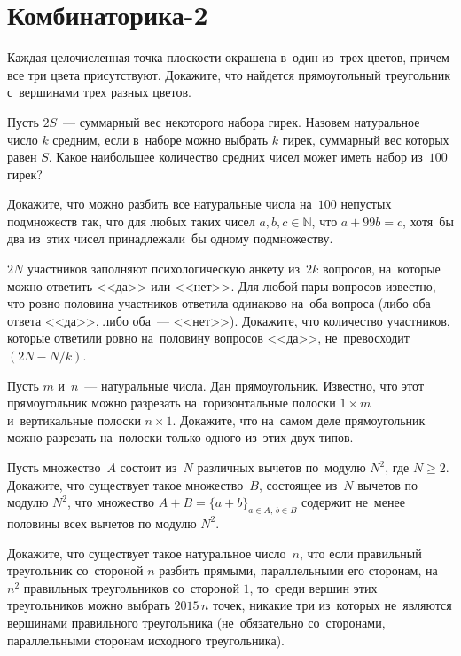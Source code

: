 
\section*{Комбинаторика-2}


\begin{problems}

\item
Каждая целочисленная точка плоскости окрашена в~один из~трех цветов, причем все
три цвета присутствуют.
Докажите, что найдется прямоугольный треугольник с~вершинами трех разных
цветов.

\item
Пусть $2 S$~--- суммарный вес некоторого набора гирек.
Назовем натуральное число $k$ средним, если в~наборе можно выбрать $k$ гирек,
суммарный вес которых равен $S$.
Какое наибольшее количество средних чисел может иметь набор из~$100$ гирек?

\item
Докажите, что можно разбить все натуральные числа на~$100$ непустых подмножеств
так, что для любых таких чисел $a, b, c \in \mathbb{N}$, что $a + 99 b = c$,
хотя~бы два из~этих чисел принадлежали~бы одному подмножеству.

\item
$2 N$ участников заполняют психологическую анкету из~$2 k$ вопросов, на~которые
можно ответить <<да>> или <<нет>>.
Для любой пары вопросов известно, что ровно половина участников ответила
одинаково на~оба вопроса (либо оба ответа <<да>>, либо оба~--- <<нет>>).
Докажите, что количество участников, которые ответили ровно на~половину
вопросов <<да>>, не~превосходит $(2 N - N / k)$.

\item
Пусть $m$ и~$n$~--- натуральные числа.
Дан прямоугольник.
Известно, что этот прямоугольник можно разрезать на~горизонтальные полоски
$1 \times m$ и~вертикальные полоски $n \times 1$.
Докажите, что на~самом деле прямоугольник можно разрезать на~полоски только
одного из~этих двух типов.

\item
Пусть множество~$A$ состоит из~$N$ различных вычетов по~модулю $N^2$, где
$N \geq 2$.
Докажите, что существует такое множество~$B$, состоящее из~$N$ вычетов
по модулю $N^2$, что множество
\(
    A + B = \{ a + b \}_{a \in A, \, b \in B}
\)
содержит не~менее половины всех вычетов по модулю $N^2$.

\item
Докажите, что существует такое натуральное число~$n$, что если правильный
треугольник со~стороной $n$ разбить прямыми, параллельными его сторонам,
на~$n^2$ правильных треугольников со~стороной $1$, то~среди вершин этих
треугольников можно выбрать $2015 \, n$ точек, никакие три из~которых
не~являются вершинами правильного треугольника (не~обязательно со~сторонами,
параллельными сторонам исходного треугольника).

\end{problems}

